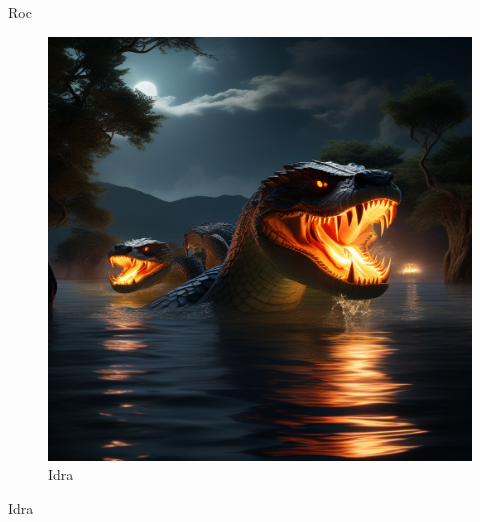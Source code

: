 Roc

\begin{figure}
\centering
\includegraphics{an-hydra-emerging-from-a-lake-at-night-with-its-7-heads-a-full-moon-on-the-background-shines-on-th.png}
\caption{Idra}
\end{figure}

Idra
